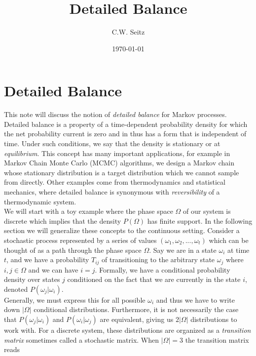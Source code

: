 \documentclass{article}
\title{Detailed Balance}
\author{C.W. Seitz}
\date{\today}
\begin{document}
\maketitle

\section{Detailed Balance}

This note will discuss the notion of \emph{detailed balance} for Markov processes. Detailed balance is a property of a time-dependent probability density for which the net probability current is zero and in thus has a form that is independent of time. Under such conditions, we say that the density is stationary or at \emph{equilibrium}. This concept has many important applications, for example in Markov Chain Monte Carlo (MCMC) algorithms, we design a Markov chain whose stationary distribution is a target distribution which we cannot sample from directly. Other examples come from thermodynamics and statistical mechanics, where detailed balance is synonymous with \emph{reversibility} of a thermodynamic system.\\

We will start with a toy example where the phase space $\Omega$ of our system is discrete which implies that the density $P(\Omega)$ has finite support. In the following section we will generalize these concepts to the continuous setting. Consider a stochastic process represented by a series of values $(\omega_{1}, 
\omega_{2},...,\omega_{t})$ which can be thought of as a path through the phase space $\Omega$. Say we are in a state $\omega_{i}$ at time $t$, and we have a probability $T_{ij}$ of transitioning to the arbitrary state $\omega_{j}$ where $i,j\in\Omega$ and we can have $i=j$. Formally, we have a conditional probability density over states $j$ conditioned on the fact that we are currently in the state $i$, denoted $P(\omega_{j}|\omega_{i})$.\\ 

Generally, we must express this for all possible $\omega_{i}$ and thus we have to write down $|\Omega|$ conditional distributions. Furthermore, it is not necessarily the case that $P(\omega_{j}|\omega_{i})$ and $P(\omega_{i}|\omega_{j})$ are equivalent, giving us $2|\Omega|$ distributions to work with. For a discrete system, these distributions are organized as a \emph{transition matrix} sometimes called a stochastic matrix. When $|\Omega|=3$ the transition matrix reads
\end{document}
